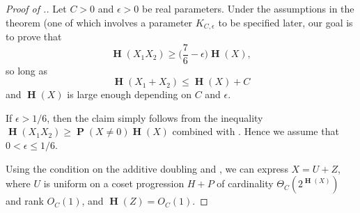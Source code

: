 \documentclass[twoside, 10pt]{article}
\newcommand\eps{\epsilon}
\DeclareMathOperator{\Eta}{\mathbf{H}}
\DeclareMathOperator{\pr}{\mathbf{P}}
\begin{document}
\begin{proof}[Proof of .]
Let $C>0$ and $\eps>0$ be real parameters.
Under the assumptions in the theorem (one of which involves a parameter $K_{C,\eps}$ to be specified later,
our goal is to prove that
$$\Eta(X_1X_2) \ge \biggl( \frac76-\eps \biggr) \Eta(X),$$
so long as
$$\Eta(X_1+X_2) \le \Eta(X) + C$$
and $\Eta(X)$ is large enough depending on $C$ and $\eps$.

If $\eps > 1/6$, then the claim simply follows from the inequality $\Eta(X_1X_2) \geq 
\pr(X\neq 0)\Eta(X)$ combined with . Hence we assume that $0<\eps \leq 1/6$. 

Using the condition on the additive doubling and , we can express $X = U+Z$, where $U$ is uniform on a coset progression $H+P$ of cardinality $\Theta_C(2^{\Eta(X)})$ and rank $O_C(1)$, and $\Eta(Z) = O_C(1)$. 


\end{proof}
\end{document}
